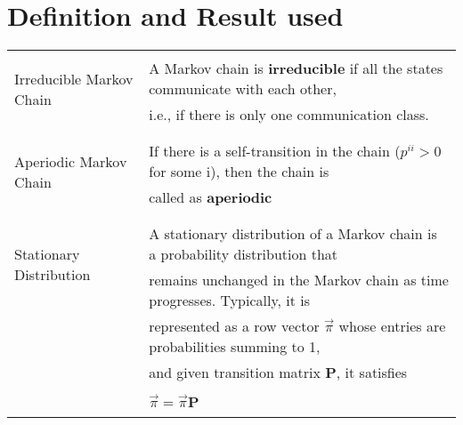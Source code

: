 \documentclass[journal,12pt]{IEEEtran}
\begin{document}
	\section{\textbf{Definition and Result used}}
	\begin{longtable}{|l|l|}
		\hline
		\multirow{3}{*}{Irreducible Markov Chain} 
		& \\
		& A Markov chain is $\textbf{irreducible}$ if all the states communicate with each other,\\
		& i.e., if there is only one communication class.\\
		&\\
		\hline
		\multirow{3}{*}{Aperiodic Markov Chain} & \\
		& If there is a self-transition in the chain ($p^{ii}>0$ for some i), then the chain is\\
		& called as $\textbf{aperiodic}$\\
		& \\
		\hline
		\multirow{3}{*}{Stationary Distribution} & \\
		& A stationary distribution of a Markov chain is a probability distribution that\\
		& remains unchanged in the Markov chain as time progresses. Typically, it is\\
		& represented as a row vector $\Vec{\pi}$ whose entries are probabilities summing to 1,\\ 
		& and given transition matrix $\textbf{P}$, it satisfies\\
		& \\
		&  \qquad \qquad  \qquad$\Vec{\pi} = \Vec{\pi} \textbf{P}$\\
		& \\
		\hline
	\end{longtable}
	\newpage
\end{document}
